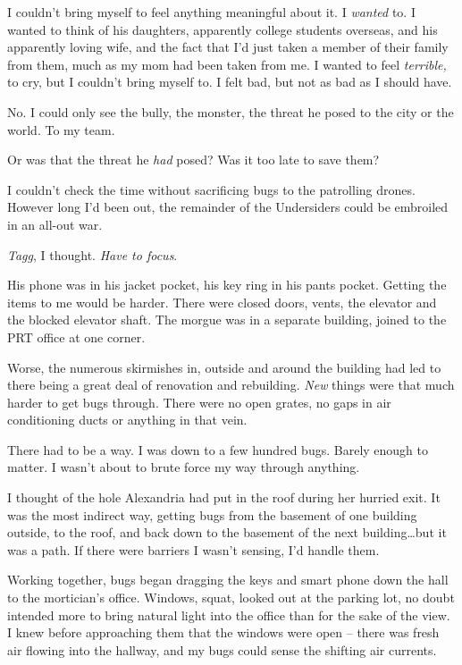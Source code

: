 I couldn't bring myself to feel anything meaningful about it.  I \emph{wanted} to.  I wanted to think of his daughters, apparently college students overseas, and his apparently loving wife, and the fact that I'd just taken a member of their family from them, much as my mom had been taken from me.  I wanted to feel \emph{terrible, }to cry, but I couldn't bring myself to.  I felt bad, but not as bad as I should have.



No.  I could only see the bully, the monster, the threat he posed to the city or the world.  To my team.



Or was that the threat he \emph{had} posed?  Was it too late to save them?



I couldn't check the time without sacrificing bugs to the patrolling drones.  However long I'd been out, the remainder of the Undersiders could be embroiled in an all-out war.



\emph{Tagg},  I thought.  \emph{Have to focus}.



His phone was in his jacket pocket, his key ring in his pants pocket.  Getting the items to me would be harder.  There were closed doors, vents, the elevator and the blocked elevator shaft.  The morgue was in a separate building, joined to the PRT office at one corner.



Worse, the numerous skirmishes in, outside and around the building had led to there being a great deal of renovation and rebuilding.  \emph{New} things were that much harder to get bugs through.  There were no open grates, no gaps in air conditioning ducts or anything in that vein.



There had to be a way.  I was down to a few hundred bugs.  Barely enough to matter.  I wasn't about to brute force my way through anything.



I thought of the hole Alexandria had put in the roof during her hurried exit.  It was the most indirect way, getting bugs from the basement of one building outside, to the roof, and back down to the basement of the next building\ldots but it was a path.  If there were barriers I wasn't sensing, I'd handle them.



Working together, bugs began dragging the keys and smart phone down the hall to the mortician's office.  Windows, squat, looked out at the parking lot, no doubt intended more to bring natural light into the office than for the sake of the view.  I knew before approaching them that the windows were open – there was fresh air flowing into the hallway, and my bugs could sense the shifting air currents.



